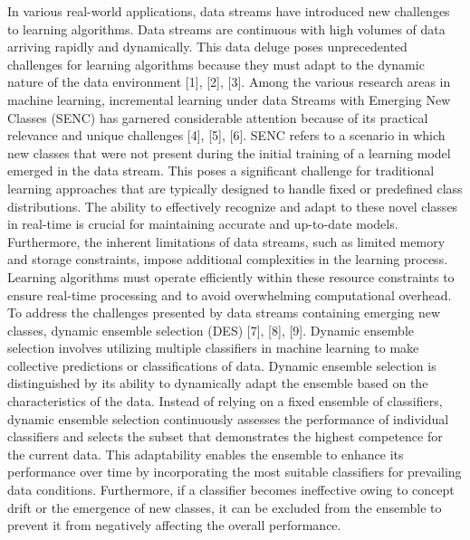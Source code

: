   In various real-world applications, data streams have introduced new challenges to learning algorithms. Data streams are continuous with high volumes of data arriving rapidly and dynamically. This data deluge poses unprecedented challenges for learning algorithms because they must adapt to the dynamic nature of the data environment [1], [2], [3]. Among the various research areas in machine learning, incremental learning under data Streams with Emerging New Classes (SENC) has garnered considerable attention because of its practical relevance and unique challenges [4], [5], [6]. SENC refers to a scenario in which new classes that were not present during the initial training of a learning model emerged in the data stream. This poses a significant challenge for traditional learning approaches that are typically designed to handle fixed or predefined class distributions. The ability to effectively recognize and adapt to these novel classes in real-time is crucial for maintaining accurate and up-to-date models. Furthermore, the inherent limitations of data streams, such as limited memory and storage constraints, impose additional complexities in the learning process. Learning algorithms must operate efficiently within these resource constraints to ensure real-time processing and to avoid overwhelming computational overhead.
  To address the challenges presented by data streams containing emerging new classes, dynamic ensemble selection (DES) [7], [8], [9]. Dynamic ensemble selection involves utilizing multiple classifiers in machine learning to make collective predictions or classifications of data. Dynamic ensemble selection is distinguished by its ability to dynamically adapt the ensemble based on the characteristics of the data. Instead of relying on a fixed ensemble of classifiers, dynamic ensemble selection continuously assesses the performance of individual classifiers and selects the subset that demonstrates the highest competence for the current data. This adaptability enables the ensemble to enhance its performance over time by incorporating the most suitable classifiers for prevailing data conditions. Furthermore, if a classifier becomes ineffective owing to concept drift or the emergence of new classes, it can be excluded from the ensemble to prevent it from negatively affecting the overall performance.
